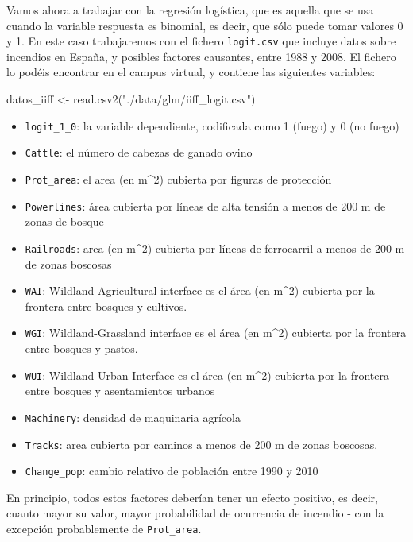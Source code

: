 \documentclass[
  letterpaper,
  DIV=11,
  numbers=noendperiod]{scrreprt}
\newenvironment{Shaded}{\begin{snugshade}}{\end{snugshade}}
\newcommand{\FunctionTok}[1]{\textcolor[rgb]{0.28,0.35,0.67}{#1}}
\newcommand{\NormalTok}[1]{\textcolor[rgb]{0.00,0.23,0.31}{#1}}
\newcommand{\OtherTok}[1]{\textcolor[rgb]{0.00,0.23,0.31}{#1}}
\newcommand{\StringTok}[1]{\textcolor[rgb]{0.13,0.47,0.30}{#1}}
\providecommand{\tightlist}{%
  \setlength{\itemsep}{0pt}\setlength{\parskip}{0pt}}\usepackage{longtable,booktabs,array}
\begin{document}
Vamos ahora a trabajar con la regresión logística, que es aquella que se
usa cuando la variable respuesta es binomial, es decir, que sólo puede
tomar valores 0 y 1. En este caso trabajaremos con el fichero
\texttt{logit.csv} que incluye datos sobre incendios en España, y
posibles factores causantes, entre 1988 y 2008. El fichero lo podéis
encontrar en el campus virtual, y contiene las siguientes variables:

\begin{Shaded}
\begin{Highlighting}[]
\NormalTok{datos\_iiff }\OtherTok{\textless{}{-}} \FunctionTok{read.csv2}\NormalTok{(}\StringTok{"./data/glm/iiff\_logit.csv"}\NormalTok{)}
\end{Highlighting}
\end{Shaded}

\begin{itemize}
\tightlist
\item
  \texttt{logit\_1\_0}: la variable dependiente, codificada como 1
  (fuego) y 0 (no fuego)
\item
  \texttt{Cattle}: el número de cabezas de ganado ovino
\item
  \texttt{Prot\_area}: el area (en m\^{}2) cubierta por figuras de
  protección
\item
  \texttt{Powerlines}: área cubierta por líneas de alta tensión a menos
  de 200 m de zonas de bosque
\item
  \texttt{Railroads}: area (en m\^{}2) cubierta por líneas de
  ferrocarril a menos de 200 m de zonas boscosas
\item
  \texttt{WAI}: Wildland-Agricultural interface es el área (en m\^{}2)
  cubierta por la frontera entre bosques y cultivos.
\item
  \texttt{WGI}: Wildland-Grassland interface es el área (en m\^{}2)
  cubierta por la frontera entre bosques y pastos.
\item
  \texttt{WUI}: Wildland-Urban Interface es el área (en m\^{}2) cubierta
  por la frontera entre bosques y asentamientos urbanos
\item
  \texttt{Machinery}: densidad de maquinaria agrícola
\item
  \texttt{Tracks}: area cubierta por caminos a menos de 200 m de zonas
  boscosas.
\item
  \texttt{Change\_pop}: cambio relativo de población entre 1990 y 2010
\end{itemize}

En principio, todos estos factores deberían tener un efecto positivo, es
decir, cuanto mayor su valor, mayor probabilidad de ocurrencia de
incendio - con la excepción probablemente de \texttt{Prot\_area}.
\end{document}
